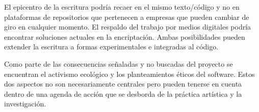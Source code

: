 
El epicentro de la escritura podría recaer en el mismo texto/código y no en plataformas de repositorios que pertenecen a empresas que pueden cambiar de giro en cualquier momento. El respaldo del trabajo por medios digitales podría encontrar soluciones actuales en la encriptación. Ambas posibilidades pueden extender la escritura a formas experimentales e integradas al código. 

Como parte de las consecuencias señaladas y no buscadas del proyecto se encuentran el activismo ecológico y los planteamientos éticos del software. Estos dos aspectos no son necesariamente centrales pero pueden tenerse en cuenta dentro de una agenda de acción que se desborda de la práctica artística y la investigación.  

